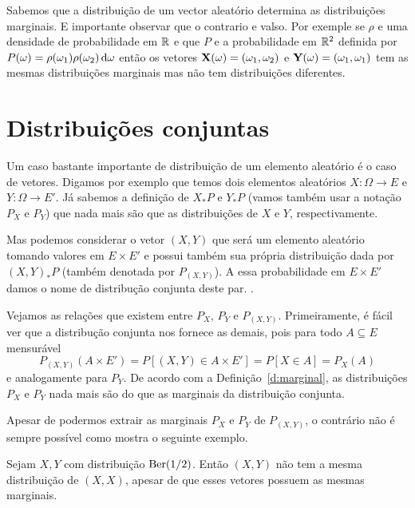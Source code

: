 \begin{remark}
 Sabemos que a distribuição de um vector aleatório determina as distribuições marginais.
 E importante observar que o contrario e valso. Por exemple se $\rho$ e uma densidade de probabilidade em ${\mathbb R}$ e que $P$ e
 a probabilidade em ${\mathbb R}^2$ definida por $P(\omega)=\rho(\omega_1)\rho(\omega_2)\mathop{}\!\mathrm{d} \omega$ então os vetores ${\bf X}(\omega)=(\omega_1,\omega_2)$ e ${\bf Y}(\omega)=(\omega_1,\omega_1)$
 tem as mesmas distribuições marginais mas não tem distribuições diferentes.


\end{remark}




\section{Distribuições conjuntas}

Um caso bastante importante de distribuição de um elemento aleatório é o caso de vetores.
Digamos por exemplo que temos dois elementos aleatórios $X:\Omega \to E$ e $Y:\Omega \to E'$.
Já sabemos a definição de $X_*P$ e $Y_*P$ (vamos também usar a notação $P_X$ e $P_Y$) que nada mais são que as distribuições de $X$ e $Y$, respectivamente.

Mas podemos considerar o vetor $(X, Y)$ que será um elemento aleatório tomando valores em $E \times E'$ e possui também sua própria distribuição dada por $(X, Y)_*P$ (também denotada por $P_{(X, Y)}$).
A essa probabilidade em $E \times E'$ damos o nome de distribução conjunta deste par. .

Vejamos as relações que existem entre $P_X$, $P_Y$ e $P_{(X,Y)}$.
Primeiramente, é fácil ver que a distribução conjunta nos fornece as demais, pois para todo $A \subseteq E$ mensurável
\begin{equation}
  P_{(X,Y)}(A \times E') = P[(X, Y) \in A \times E'] = P[X \in A] = P_X(A)
\end{equation}
e analogamente para $P_Y$.
De acordo com a Definição~\ref{d:marginal}, as distribuições $P_X$ e $P_Y$ nada mais são do que as marginais da distribuição conjunta.

Apesar de podermos extrair as marginais $P_X$ e $P_Y$ de $P_{(X,Y)}$, o contrário não é sempre possível como mostra o seguinte exemplo.
\begin{example}
  Sejam $X, Y$ \iid com distribuição $\operatorname{Ber}(1/2)$.
  Então $(X, Y)$ não tem a mesma distribuição de $(X, X)$, apesar de que esses vetores possuem as mesmas marginais.
\end{example}

